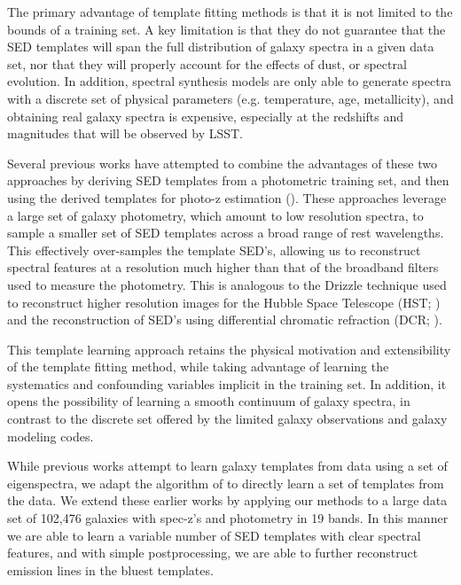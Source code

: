 The primary advantage of template fitting methods is that it is not limited to the bounds of a training set. 
A key limitation is that they do not guarantee that the SED templates will span the full distribution of galaxy spectra in a given data set, nor that they will properly account for the effects of dust, or spectral evolution.
In addition, spectral synthesis models are only able to generate spectra with a discrete set of physical parameters (e.g. temperature, age, metallicity), and obtaining real galaxy spectra is expensive, especially at the redshifts and magnitudes that will be observed by LSST.

Several previous works have attempted to combine the advantages of these two approaches by deriving SED templates from a photometric training set, and then using the derived templates for photo-z estimation (\citealt{Budavari2000b,Csabai2000}). These approaches
leverage a large set of galaxy photometry, which amount to low resolution spectra, to sample a smaller set of SED templates across a broad range of rest wavelengths.
This effectively over-samples the template SED's, allowing us to reconstruct spectral features at a resolution much higher than that of the broadband filters used to measure the photometry.
This  is analogous to the Drizzle technique used to reconstruct higher resolution images for the Hubble Space Telescope (HST; \citealt{Fruchter2002}) and the reconstruction of SED's using differential chromatic refraction (DCR; \citealt{Lee2019}).


This template learning approach retains the physical motivation and extensibility of the template fitting method, while taking advantage of learning the systematics and confounding variables implicit in the training set.
In addition, it opens the possibility of learning a smooth continuum of galaxy spectra, in contrast to the discrete set offered by the limited galaxy observations and galaxy modeling codes. 

While previous works attempt to learn galaxy templates from data using a set of eigenspectra, we adapt the algorithm of \citet{Budavari2000b} to directly learn a set of templates from the data.%
We extend these earlier works by applying our methods to a large data set of 102,476 galaxies with spec-z's and photometry in 19 bands.
In this manner we are able to learn a variable number of SED templates with clear spectral features, and with simple postprocessing, we are able to further reconstruct emission lines in the bluest templates.

